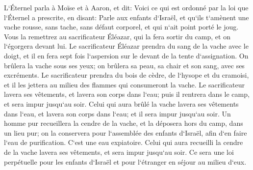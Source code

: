 \verse L`Éternel parla à Moïse et à Aaron, et dit: 
\verse Voici ce qui est ordonné par la loi que l`Éternel a prescrite, en disant: Parle aux enfants d`Israël, et qu`ils t`amènent une vache rousse, sans tache, sans défaut corporel, et qui n`ait point porté le joug. 
\verse Vous la remettrez au sacrificateur Éléazar, qui la fera sortir du camp, et on l`égorgera devant lui. 
\verse Le sacrificateur Éléazar prendra du sang de la vache avec le doigt, et il en fera sept fois l`aspersion sur le devant de la tente d`assignation. 
\verse On brûlera la vache sous ses yeux; on brûlera sa peau, sa chair et son sang, avec ses excréments. 
\verse Le sacrificateur prendra du bois de cèdre, de l`hysope et du cramoisi, et il les jettera au milieu des flammes qui consumeront la vache. 
\verse Le sacrificateur lavera ses vêtements, et lavera son corps dans l`eau; puis il rentrera dans le camp, et sera impur jusqu`au soir. 
\verse Celui qui aura brûlé la vache lavera ses vêtements dans l`eau, et lavera son corps dans l`eau; et il sera impur jusqu`au soir. 
\verse Un homme pur recueillera la cendre de la vache, et la déposera hors du camp, dans un lieu pur; on la conservera pour l`assemblée des enfants d`Israël, afin d`en faire l`eau de purification. C`est une eau expiatoire. 
\verse Celui qui aura recueilli la cendre de la vache lavera ses vêtements, et sera impur jusqu`au soir. Ce sera une loi perpétuelle pour les enfants d`Israël et pour l`étranger en séjour au milieu d`eux. 
